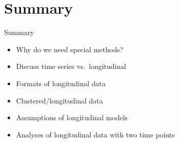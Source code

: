 \documentclass[
  9pt,
  ignorenonframetext,
]{beamer}
\providecommand{\tightlist}{%
  \setlength{\itemsep}{0pt}\setlength{\parskip}{0pt}}
\begin{document}
\hypertarget{summary}{%
\section{Summary}\label{summary}}

\begin{frame}{Summary}
\protect\hypertarget{summary-1}{}
\begin{itemize}
\tightlist
\item
  Why do we need special methods?
\item
  Discuss time series vs.~longitudinal
\item
  Formats of longitudinal data
\item
  Clustered/longitudinal data
\item
  Assumptions of longitudinal models
\item
  Analyses of longitudinal data with two time points
\end{itemize}
\end{frame}
\end{document}
